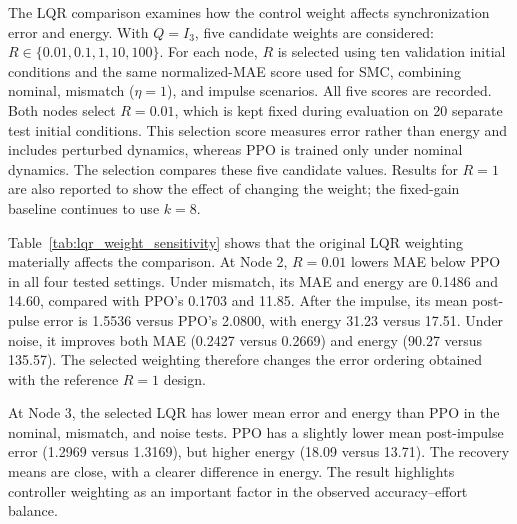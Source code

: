 
The LQR comparison examines how the control weight affects synchronization error and energy. With $Q=I_3$, five candidate weights are considered: $R\in\{0.01,0.1,1,10,100\}$. For each node, $R$ is selected using ten validation initial conditions and the same normalized-MAE score used for SMC, combining nominal, mismatch ($\eta=1$), and impulse scenarios. All five scores are recorded. Both nodes select $R=0.01$, which is kept fixed during evaluation on 20 separate test initial conditions. This selection score measures error rather than energy and includes perturbed dynamics, whereas PPO is trained only under nominal dynamics. The selection compares these five candidate values. Results for $R=1$ are also reported to show the effect of changing the weight; the fixed-gain baseline continues to use $k=8$.



Table~\ref{tab:lqr_weight_sensitivity} shows that the original LQR weighting materially affects the comparison. At Node 2, $R=0.01$ lowers MAE below PPO in all four tested settings. Under mismatch, its MAE and energy are 0.1486 and 14.60, compared with PPO's 0.1703 and 11.85. After the impulse, its mean post-pulse error is 1.5536 versus PPO's 2.0800, with energy 31.23 versus 17.51. Under noise, it improves both MAE (0.2427 versus 0.2669) and energy (90.27 versus 135.57). The selected weighting therefore changes the error ordering obtained with the reference $R=1$ design.

At Node 3, the selected LQR has lower mean error and energy than PPO in the nominal, mismatch, and noise tests. PPO has a slightly lower mean post-impulse error (1.2969 versus 1.3169), but higher energy (18.09 versus 13.71). The recovery means are close, with a clearer difference in energy. The result highlights controller weighting as an important factor in the observed accuracy--effort balance.
